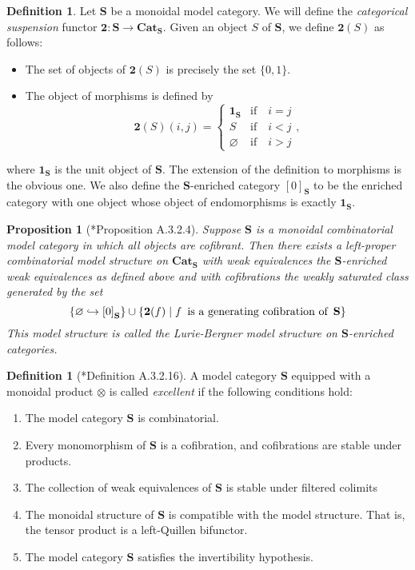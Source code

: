 \documentclass[a4paper]{article}
\numberwithin{equation}{subsection}
\theoremstyle{plain}   %
\newtheorem{prop}[equation]{Proposition}
\theoremstyle{definition}
\newtheorem{defn}[equation]{Definition}
\theoremstyle{remark}
\theoremstyle{plain}
\newcommand{\Cat}{\ensuremath{\mathbf{Cat}}}
\begin{document}
\begin{defn}
	Let \(\mathbf{S}\) be a monoidal model category.  We will define the \emph{categorical suspension} functor \(\mathbf{2}:\mathbf{S} \to \Cat_{\mathbf{S}}\).  Given an object \(S\) of \(\mathbf{S}\), we define \(\mathbf{2}(S)\) as follows:  
	\begin{itemize}
		\item The set of objects of \(\mathbf{2}(S)\) is precisely the set \(\{0,1\}\).
		\item The object of morphisms is defined by 
		\[
			\mathbf{2}(S)(i,j)=
			\begin{cases}
				\mathbf{1}_\mathbf{S} & \text{if}\quad i=j\\
				S & \text{if}\quad i<j\\
				\varnothing & \text{if} \quad i>j
			\end{cases},
		\]  
	\end{itemize}
	where \(\mathbf{1}_{\mathbf{S}}\) is the unit object of \(\mathbf{S}\). The extension of the definition to morphisms is the obvious one.
	We also define the \(\mathbf{S}\)-enriched category \({[0]}_{\mathbf{S}}\) to be the enriched category with one object whose object of endomorphisms is exactly \(\mathbf{1}_{\mathbf{S}}\).  
\end{defn}
\begin{prop}[\cite{htt}*{Proposition A.3.2.4}]
	Suppose \(\mathbf{S}\) is a monoidal combinatorial model category in which all objects are cofibrant.  Then there exists a left-proper combinatorial model structure on \(\Cat_{\mathbf{S}}\) with weak equivalences the \(\mathbf{S}\)-enriched weak equivalences as defined above and with cofibrations the weakly saturated class generated by the set
	\[
		\{\varnothing \hookrightarrow {[0]}_{\mathbf{S}}\}\cup \{\mathbf{2}(f)\mid f \enskip \text{is a generating cofibration of} \enskip \mathbf{S}\} 
	\]
	This model structure is called the Lurie-Bergner model structure on \(\mathbf{S}\)-enriched categories.
\end{prop}
\begin{defn}[\cite{htt}*{Definition A.3.2.16}]
	A model category \(\mathbf{S}\) equipped with a monoidal product \(\otimes\) is called \emph{excellent} if the following conditions hold:
	\begin{enumerate}[label=(A\arabic*{})]
		\item The model category \(\mathbf{S}\) is combinatorial.
		\item Every monomorphism of \(\mathbf{S}\) is a cofibration, and cofibrations are stable under products.
		\item The collection of weak equivalences of \(\mathbf{S}\) is stable under filtered colimits
		\item The monoidal structure of \(\mathbf{S}\) is compatible with the model structure.  That is, the tensor product is a left-Quillen bifunctor.
		\item The model category \(\mathbf{S}\) satisfies the invertibility hypothesis.
	\end{enumerate}
\end{defn}
\end{document}

